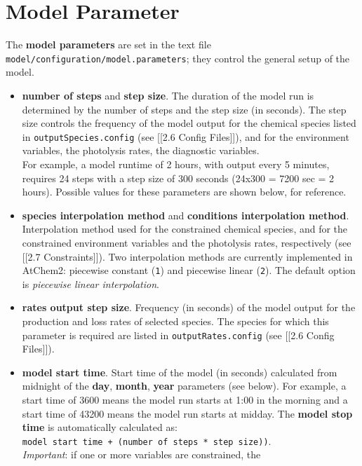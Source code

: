 \chapter{Model Parameter}

The \textbf{model parameters} are set in the text file
\texttt{model/configuration/model.parameters}; they control the general
setup of the model.

\begin{itemize}
\item
  \textbf{number of steps} and \textbf{step size}. The duration of the
  model run is determined by the number of steps and the step size (in
  seconds). The step size controls the frequency of the model output for
  the chemical species listed in \texttt{outputSpecies.config} (see
  {[}{[}2.6 Config Files{]}{]}), and for the environment variables, the
  photolysis rates, the diagnostic variables.\\
  For example, a model runtime of 2 hours, with output every 5 minutes,
  requires 24 steps with a step size of 300 seconds (24x300 = 7200 sec =
  2 hours). Possible values for these parameters are shown below, for
  reference.
\item
  \textbf{species interpolation method} and \textbf{conditions
  interpolation method}. Interpolation method used for the constrained
  chemical species, and for the constrained environment variables and
  the photolysis rates, respectively (see {[}{[}2.7 Constraints{]}{]}).
  Two interpolation methods are currently implemented in AtChem2:
  piecewise constant (\texttt{1}) and piecewise linear (\texttt{2}). The
  default option is \emph{piecewise linear interpolation}.
\item
  \textbf{rates output step size}. Frequency (in seconds) of the model
  output for the production and loss rates of selected species. The
  species for which this parameter is required are listed in
  \texttt{outputRates.config} (see {[}{[}2.6 Config Files{]}{]}).
\item
  \textbf{model start time}. Start time of the model (in seconds)
  calculated from midnight of the \textbf{day}, \textbf{month},
  \textbf{year} parameters (see below). For example, a start time of
  3600 means the model run starts at 1:00 in the morning and a start
  time of 43200 means the model run starts at midday. The \textbf{model
  stop time} is automatically calculated as:
  \texttt{model\ start\ time\ +\ (number\ of\ steps\ *\ step\ size))}.\\
  \emph{Important}: if one or more variables are constrained, the

\end{itemize}
